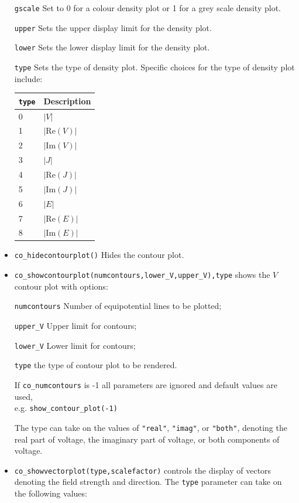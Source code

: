 \begin{itemize}
\texttt{gscale} Set to 0 for a colour density plot or 1 for a grey scale
density plot.

\texttt{upper} Sets the upper display limit for the density plot.

\texttt{lower} Sets the lower display limit for the density plot.

\texttt{type} Sets the type of density plot. Specific choices for the type of density plot include:

\begin{tabular}{ll}
\texttt{type} &  Description  \\ \hline
0 & $|V|$		\\
1 & $| \mbox{Re}(V)|$	\\
2 & $| \mbox{Im}(V)|$	\\
3 & $|J|$		\\
4 & $|\mbox{Re}(J)|$	\\
5 & $|\mbox{Im}(J)|$	\\
6 & $|E|$		\\
7 & $|\mbox{Re}(E)|$	\\
8 & $|\mbox{Im}(E)|$
\end{tabular}

\item \texttt{co\_hidecontourplot()} Hides the contour plot.

\item \texttt{co\_showcontourplot(numcontours,lower{\_}V,upper{\_}V),type} shows the
$V$ contour plot with options:

\texttt{numcontours} Number of equipotential lines to be plotted;

\texttt{upper{\_}V} Upper limit for contours;

\texttt{lower{\_}V} Lower limit for contours; 

\texttt{type} the type of contour plot to be rendered.

If \texttt{co\_numcontours} is -1 all parameters are ignored and
default values are used, \\ e.g. \texttt{show{\_}contour{\_}plot(-1)}

The type can take on the values of {\tt "real"}, {\tt "imag"}, or {\tt "both"}, denoting
the real part of voltage, the imaginary part of voltage, or both components of voltage.

\item \texttt{co\_showvectorplot(type,scalefactor)}
controls the display of vectors denoting the field strength and
direction. The \texttt{type} parameter can take on the following values:


\end{itemize}

